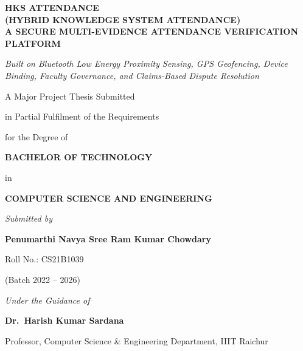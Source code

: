 \documentclass[12pt, a4paper, oneside]{report}
\newcommand{\thesisTitleDisplay}{HKS ATTENDANCE \\ (HYBRID KNOWLEDGE SYSTEM ATTENDANCE) \\ A SECURE MULTI-EVIDENCE ATTENDANCE VERIFICATION PLATFORM }
\newcommand{\studentName}{Penumarthi Navya Sree Ram Kumar Chowdary}
\newcommand{\rollNumber}{CS21B1039}
\newcommand{\supervisorName}{Dr.~Harish Kumar Sardana}
\newcommand{\supervisorDesignation}{Professor, Computer Science \& Engineering Department, IIIT Raichur}
\newcommand{\departmentName}{Computer Science and Engineering}
\newcommand{\degreeName}{Bachelor of Technology}
\begin{document}
\begin{titlepage}
    \centering
    \thispagestyle{empty}
    \vspace*{0.2cm}

    {\Large\bfseries \thesisTitleDisplay \par}
    \vspace{0.4cm}

    {\normalsize\itshape Built on Bluetooth Low Energy Proximity Sensing, GPS Geofencing, Device Binding, Faculty Governance, and Claims-Based Dispute Resolution \par}
    \vspace{0.8cm}

    {\normalsize A Major Project Thesis Submitted \par}
    {\normalsize in Partial Fulfilment of the Requirements \par}
    {\normalsize for the Degree of \par}
    \vspace{0.5cm}

    {\large\bfseries \MakeUppercase{\degreeName} \par}
    \vspace{0.3cm}

    {\normalsize in \par}
    \vspace{0.2cm}

    {\large\bfseries \MakeUppercase{\departmentName} \par}
    \vspace{0.5cm}

    {\normalsize\itshape Submitted by \par}
    \vspace{0.3cm}

    {\normalsize\bfseries \studentName{} \par}
    {\normalsize Roll No.: \rollNumber \par}
    {\normalsize (Batch 2022 -- 2026) \par}
    \vspace{0.5cm}

    {\normalsize\itshape Under the Guidance of \par}
    \vspace{0.2cm}
    {\normalsize\bfseries \supervisorName{} \par}
    {\normalsize \supervisorDesignation{} \par}
    \vspace{0.5cm}


\end{titlepage}
\end{document}
